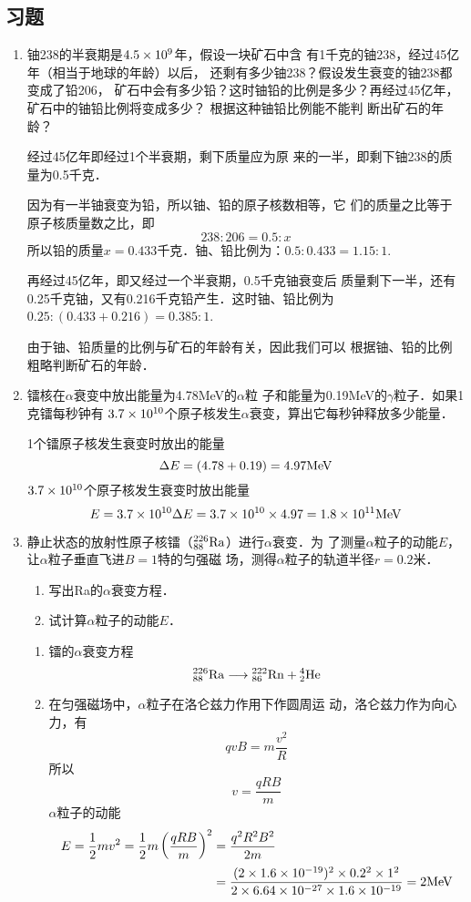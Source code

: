 \subsection{习题}
\begin{enumerate}
    \item 铀238的半衰期是$4.5\x 10^9$年，假设一块矿石中含
有1千克的铀238，经过45亿年（相当于地球的年龄）以后，
还剩有多少铀238？假设发生衰变的铀238都变成了铅206，
矿石中会有多少铅？这时铀铅的比例是多少？再经过45亿年，
矿石中的铀铅比例将变成多少？ 根据这种铀铅比例能不能判
断出矿石的年龄？


\begin{solution}
经过45亿年即经过1个半衰期，剩下质量应为原
来的一半，即剩下铀238的质量为0.5千克．

因为有一半铀衰变为铅，所以铀、铅的原子核数相等，它
们的质量之比等于原子核质量数之比，即
\[238:206=0.5:x\]
所以铅的质量$x=0.433$千克．铀、铅比例为：$0.5:0.433
=1.15:1$.

再经过45亿年，即又经过一个半衰期，0.5千克铀衰变后
质量剩下一半，还有0.25千克铀，又有0.216千克铅产生．这时铀、铅比例为$0.25:(0.433+0.216)=0.385:1$.

由于铀、铅质量的比例与矿石的年龄有关，因此我们可以
根据铀、铅的比例粗略判断矿石的年龄．
\end{solution}
\item 镭核在$\alpha$衰变中放出能量为4.78MeV的$\alpha$粒
子和能量为0.19MeV的$\gamma$粒子．如果1克镭每秒钟有
$3.7\x10^{10}$个原子核发生$\alpha$衰变，算出它每秒钟释放多少能量．

\begin{solution}
1个镭原子核发生衰变时放出的能量
\[\Delta E=(4.78+0.19)=4.97{\rm MeV}\]
$3.7\x10^{10}$个原子核发生衰变时放出能量
\[E=3.7\x10^{10}\Delta E=3.7\x10^{10}\x4.97=1.8\x10^{11}{\rm MeV}\]
\end{solution}
\item 静止状态的放射性原子核镭（$\atom{Ra}{226}{88}$）进行$\alpha$衰变．为
了测量$\alpha$粒子的动能$E$，让$\alpha$粒子垂直飞进$B=1$特的匀强磁
场，测得$\alpha$粒子的轨道半径$r=0.2$米．
\begin{enumerate}
    \item 写出Ra的$\alpha$衰变方程．
    \item 试计算$\alpha$粒子的动能$E$．
\end{enumerate}

\begin{solution}
\begin{enumerate}
    \item 镭的$\alpha$衰变方程
\[\atom{Ra}{226}{88}\longrightarrow \atom{Rn}{222}{86}+\atom{He}{4}{2}\]
    \item 在匀强磁场中，$\alpha$粒子在洛仑兹力作用下作圆周运
    动，洛仑兹力作为向心力，有
    \[qvB=m\frac{v^2}{R}\]
    所以 \[v=\frac{qRB}{m}\]
    $\alpha$粒子的动能
\[\begin{split}
    E=\frac{1}{2}mv^2=\frac{1}{2}m\left(\frac{qRB}{m}\right)^2    &=\frac{q^2R^2B^2}{2m}\\
&=\frac{(2\x 1.6\x 10^{-19})^2\x 0.2^2\x 1^2}{2\x 6.64\x 10^{-27}\x 1.6\x 10^{-19}}=2{\rm MeV}
\end{split}\]
\end{enumerate}



\end{solution}
\end{enumerate}
